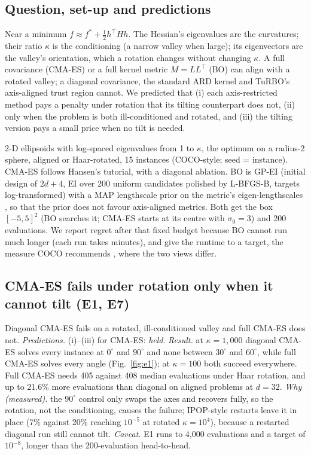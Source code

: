 \documentclass[10pt,a4paper]{article}
\begin{document}
\subsection{Question, set-up and predictions}
Near a minimum $f\approx f^*+\tfrac12h^\top Hh$. The Hessian's eigenvalues
are the curvatures; their ratio $\kappa$ is the conditioning (a narrow valley when large); its eigenvectors
are the valley's orientation, which a rotation changes without changing $\kappa$. A full covariance
(CMA-ES) or a full kernel metric $M=LL^\top$ (BO) can align with a rotated valley; a diagonal covariance,
the standard ARD kernel and TuRBO's axis-aligned trust region \citep{eriksson2019turbo} cannot. We predicted
that (i) each axis-restricted method pays a penalty under rotation that its tilting counterpart does not,
(ii) only when the problem is both ill-conditioned and rotated, and (iii) the tilting version pays a small
price when no tilt is needed.

2-D ellipsoids with log-spaced eigenvalues from 1 to $\kappa$, the optimum on a radius-2
sphere, aligned or Haar-rotated, 15 instances (COCO-style; seed = instance). CMA-ES follows Hansen's
tutorial, with a diagonal ablation. BO is GP-EI (initial design of $2d+4$, EI over 200 uniform candidates
polished by L-BFGS-B, targets log-transformed) with a MAP lengthscale prior on the metric's
eigen-lengthscales \citep{hvarfner2024vanilla}, so that the prior does not favour axis-aligned metrics. Both
get the box $[-5,5]^2$ (BO searches it; CMA-ES starts at its centre with $\sigma_0=3$) and 200 evaluations. We report regret
after that fixed budget because BO cannot run much longer (each run takes minutes), and give the runtime to a target,
the measure COCO recommends \citep{hansen2021coco}, where the two views differ.

\subsection{CMA-ES fails under rotation only when it cannot tilt (E1, E7)}
Diagonal CMA-ES fails on a rotated, ill-conditioned valley and full CMA-ES does not. \textit{Predictions.} (i)--(iii)
for CMA-ES: \emph{held}. \textit{Result.} at $\kappa=1{,}000$ diagonal CMA-ES solves every instance at $0^\circ$ and
$90^\circ$ and none between $30^\circ$ and $60^\circ$, while full CMA-ES solves every angle (Fig.~\ref{fig:e1}); at $\kappa=100$ both
succeed everywhere. Full CMA-ES needs 405 against 408 median evaluations under Haar rotation, and up to 21.6\% more
evaluations than diagonal on aligned problems at $d=32$. \textit{Why (measured).} the $90^\circ$ control only swaps the
axes and recovers fully, so the rotation, not the conditioning, causes the failure; IPOP-style restarts leave it in place (7\%
against 20\% reaching $10^{-5}$ at rotated $\kappa=10^4$), because a restarted diagonal run still cannot tilt.
\textit{Caveat.} E1 runs to 4,000 evaluations and a target of $10^{-8}$, longer than the 200-evaluation head-to-head.
\end{document}
